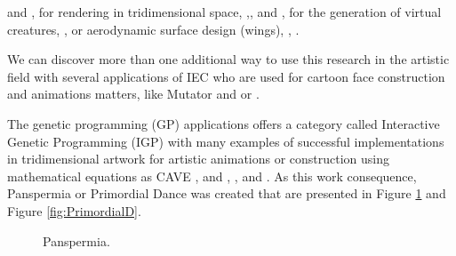 and \cite{lutton2003artie}, for rendering in tridimensional space,
\cite{todd1992artificial},\cite{broughton1997use}, \cite{das1994genetic} and \cite{tam2002genetic}, for the generation of virtual creatures,
\cite{rowland2000evolutionary}, or aerodynamic surface design (wings),
\cite{nguyen1993evolvable}, \cite{nguyen1994evolvable}.

We can discover more than one additional way to use this research in the
artistic field with several applications of IEC who are used for cartoon face
construction and animations matters, like Mutator \cite{todd1994evolutionary}
and \cite{todd1999mutation} or \cite{bentley1999introduction}.

The genetic programming (GP) applications offers a category called Interactive
Genetic Programming (IGP) with many examples of successful implementations in
tridimensional artwork for artistic animations or construction using
mathematical equations as CAVE \cite{das1994genetic}, \cite{papka1996ubiworld}
and \cite{disz1997ubiworld}, \cite{sims1991artificial},
\cite{sims1992interactive} and \cite{min2004creative}. As this work consequence,
Panspermia or Primordial Dance was created that are presented in Figure
\ref{fig:Panspermia} and Figure \ref{fig:PrimordialD}.

\begin{figure}
\captionsetup{justification=centering,margin=2cm}
\centering
\setlength\fboxsep{0pt}
\setlength\fboxrule{0.7pt}
\caption{Panspermia.}
\label{fig:Panspermia}
\end{figure}

